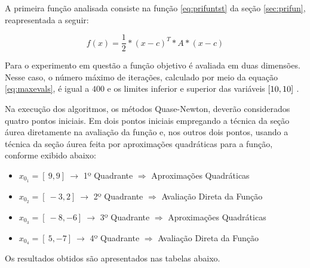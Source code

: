 



A primeira função analisada consiste na função \ref{eq:prifuntst} da seção \ref{sec:prifun}, reapresentada a seguir:

\begin{equation*} 
    f(x)= \frac{1}{2}*(x-c)^{T}*A*(x-c)
\end{equation*}

Para o experimento em questão a função objetivo é avaliada em duas dimensões. Nesse caso, o número máximo de iterações, calculado por meio da equação \ref{eq:maxevals}, é igual a $400$ e os limites inferior e superior das variáveis $[\-10, 10 ]\ $.

Na execução dos algoritmos, os métodos Quase-Newton, deverão considerados quatro pontos iniciais. Em dois pontos iniciais empregando a técnica da seção áurea diretamente na avaliação da função e, nos outros dois pontos, usando  a técnica da seção áurea feita por aproximações quadráticas para a função, conforme exibido abaixo:

\begin{itemize}
    \item $x_{0_1}=[\ 9 , 9 ]\ \rightarrow$ 1º Quadrante $\Rightarrow$ Aproximações Quadráticas  
    \item $x_{0_2}=[\ -3 , 2 ]\ \rightarrow$ 2º Quadrante $\Rightarrow$ Avaliação Direta da Função
    \item $x_{0_3}=[\ -8 , -6 ]\ \rightarrow$ 3º Quadrante $\Rightarrow$ Aproximações Quadráticas  
    \item $x_{0_4}=[\ 5 , -7 ]\ \rightarrow$ 4º Quadrante $\Rightarrow$ Avaliação Direta da Função
\end{itemize} 

Os resultados obtidos são apresentados nas tabelas abaixo.
\vspace{2mm}

